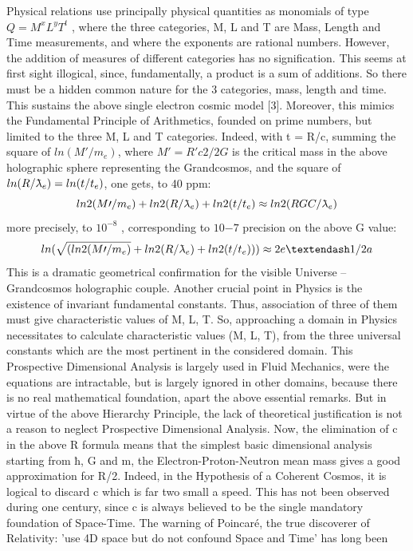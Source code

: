 Physical relations use principally physical quantities as monomials of type $Q = M^{x} L^{y} T^{t}$ , where
the three categories, M, L and T are Mass, Length and Time measurements, and where the exponents are
rational numbers. However, the addition of measures of different categories has no signification.
This seems at first sight illogical, since, fundamentally, a product is a sum of additions. So there
must be a hidden common nature for the 3 categories, mass, length and time. This sustains the
above single electron cosmic model [3]. Moreover, this mimics the Fundamental Principle of
Arithmetics, founded on prime numbers, but limited to the three M, L and T categories. Indeed, with t =
R/c, summing the square of $ln(M\prime/m_{e} )$, where $M\prime = R\prime c 2 /2G$ is the critical mass in the above
holographic sphere representing the Grandcosmos, and the square of $ln(R/\lambdabar_{e} ) = ln(t/t_{e} )$, one gets, to
40 ppm:
$$ln 2 (M\prime/m_{e} ) + ln 2 (R/\lambdabar_{e}) + ln 2 (t/t_{e} ) \approx ln 2 (R GC /\lambdabar_{e} )$$
more precisely, to $10^{-8}$ , corresponding to $10{-7}$ precision on the above G value:
$$ln(\sqrt{(ln 2 (M\prime/m_{e} )} + ln 2 (R/\lambdabar_{e} ) + ln 2 (t/t_{e} ))) \approx 2e – 1/2a$$
This is a dramatic geometrical confirmation for the visible Universe – Grandcosmos holographic
couple.
Another crucial point in Physics is the existence of invariant fundamental constants. Thus,
association of three of them must give characteristic values of M, L, T. So, approaching a domain in
Physics necessitates to calculate characteristic values (M, L, T), from the three universal constants
which are the most pertinent in the considered domain. This Prospective Dimensional Analysis is
largely used in Fluid Mechanics, were the equations are intractable, but is largely ignored in other
domains, because there is no real mathematical foundation, apart the above essential remarks. But
in virtue of the above Hierarchy Principle, the lack of theoretical justification is not a reason to
neglect Prospective Dimensional Analysis.
Now, the elimination of c in the above R formula means that the simplest basic dimensional
analysis starting from ħ, G and m, the Electron-Proton-Neutron mean mass gives a good
approximation for R/2. Indeed, in the Hypothesis of a Coherent Cosmos, it is logical to discard c
which is far two small a speed. This has not been observed during one century, since c is always
believed to be the single mandatory foundation of Space-Time. The warning of Poincaré, the true
discoverer of Relativity: 'use 4D space but do not confound Space and Time' has long been

